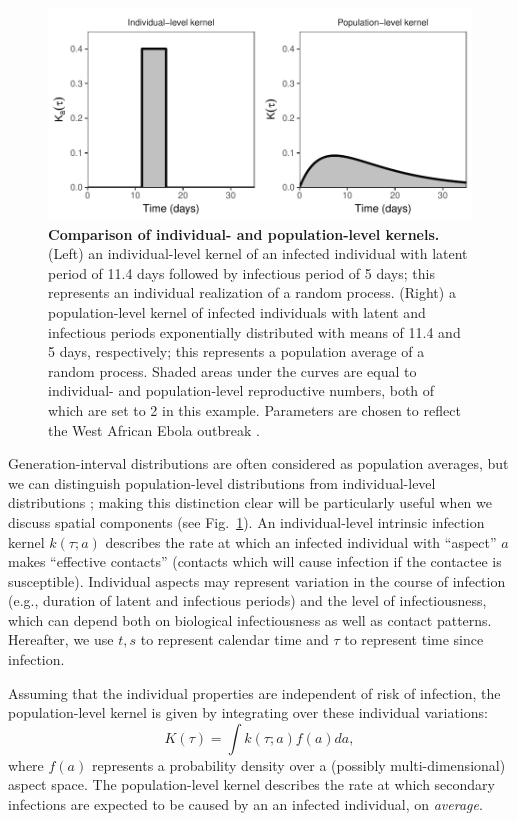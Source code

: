 \documentclass[12pt]{article}
\newcommand{\fref}[1]{Fig.~\ref{fig:#1}}
\begin{document}
\begin{figure}[!pbth]
\includegraphics[width=\textwidth]{../fig/individual_and_population.pdf}
\caption{\textbf{Comparison of individual- and population-level kernels.}
(Left) an individual-level kernel of an infected individual with latent period of 11.4 days followed by infectious period of 5 days;
this represents an individual realization of a random process.
(Right) a population-level kernel of infected individuals with latent and infectious periods exponentially distributed with means of 11.4 and 5 days, respectively;
this represents a population average of a random process.
Shaded areas under the curves are equal to individual- and population-level reproductive numbers, both of which are set to 2 in this example.
Parameters are chosen to reflect the West African Ebola outbreak \citep{who2014ebola}.}
\label{fig:indpop}
\end{figure}

Generation-interval distributions are often considered as population averages, but we can distinguish population-level distributions from individual-level distributions \citep{svensson2007note, svensson2015influence}; 
making this distinction clear will be particularly useful when we discuss spatial components (see \fref{indpop}).
An individual-level intrinsic infection kernel $k(\tau; a)$ describes the rate at which an infected individual with ``aspect'' $a$ makes ``effective contacts'' (contacts which will cause infection if the contactee is susceptible).
Individual aspects may represent variation in the course of infection (e.g., duration of latent and infectious periods) and the level of infectiousness, which can depend both on biological infectiousness as well as contact patterns.
Hereafter, we use $t, s$ to represent calendar time and $\tau$ to
represent time since infection.

Assuming that the individual properties are independent of risk of infection, the population-level kernel is given by integrating over these individual variations:
\begin{equation}
K(\tau) = \int k (\tau; a) f(a) da,
\end{equation}
where $f(a)$ represents a probability density over a (possibly multi-dimensional) aspect space.
The population-level kernel describes the rate at which secondary infections are expected to be caused by an an infected individual, on \emph{average}.
\end{document}
